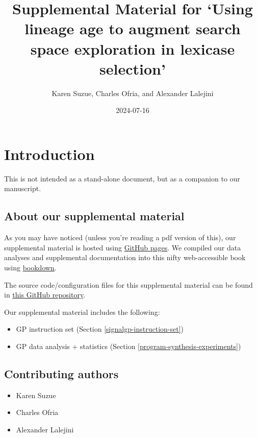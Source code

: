\documentclass[
]{book}
\title{Supplemental Material for `Using lineage age to augment search space exploration in lexicase selection'}
\author{Karen Suzue, Charles Ofria, and Alexander Lalejini}
\date{2024-07-16}
\providecommand{\tightlist}{%
  \setlength{\itemsep}{0pt}\setlength{\parskip}{0pt}}
\begin{document}
\maketitle

{
\setcounter{tocdepth}{1}
\tableofcontents
}
\hypertarget{introduction}{%
\chapter{Introduction}\label{introduction}}

This is not intended as a stand-alone document, but as a companion to our manuscript.

\hypertarget{about-our-supplemental-material}{%
\section{About our supplemental material}\label{about-our-supplemental-material}}

As you may have noticed (unless you're reading a pdf version of this), our supplemental material is hosted using \href{https://pages.github.com/}{GitHub pages}.
We compiled our data analyses and supplemental documentation into this nifty web-accessible book using \href{https://bookdown.org}{bookdown}.

The source code/configuration files for this supplemental material can be found in \href{https://github.com/amlalejini/age-based-lex}{this GitHub repository}.

Our supplemental material includes the following:

\begin{itemize}
\tightlist
\item
  GP instruction set (Section \ref{signalgp-instruction-set})
\item
  GP data analysis + statistics (Section \ref{program-synthesis-experiments})
\end{itemize}

\hypertarget{contributing-authors}{%
\section{Contributing authors}\label{contributing-authors}}

\begin{itemize}
\tightlist
\item
  Karen Suzue
\item
  Charles Ofria
\item
  Alexander Lalejini
\end{itemize}
\end{document}
